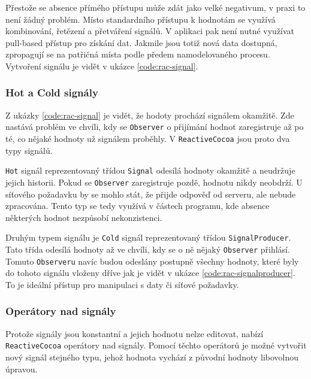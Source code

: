 Přestože se absence přímého přístupu může zdát jako velké negativum, v praxi to není žádný problém.
Místo standardního přístupu k hodnotám se využívá kombinování, řetězení a přetváření signálů.
V aplikaci pak není nutné využívat pull-based přístup pro získání dat.
Jakmile jsou totiž nová data dostupná, zpropagují se na patřičná místa podle předem namodelovaného procesu.
Vytvoření signálu je vidět v ukázce \ref{code:rac-signal}.


\subsubsection*{Hot a Cold signály}

Z ukázky \ref{code:rac-signal} je vidět, že hodoty prochází signálem okamžitě.
Zde nastává problém ve chvíli, kdy se \texttt{Observer} o přijímání hodnot zaregistruje až po té, co nějaké hodnoty už signálem proběhly.
V \texttt{ReactiveCocoa} jsou proto dva typy signálů.

\texttt{Hot} signál reprezentovaný třídou \texttt{Signal} odesílá hodnoty okamžitě a neudržuje jejich historii.
Pokud se \texttt{Observer} zaregistruje pozdě, hodnotu nikdy neobdrží.
U síťového požadavku by se mohlo stát, že přijde odpověď od serveru, ale nebude zpracována.
Tento typ se tedy využívá v částech programu, kde absence některých hodnot nezpůsobí nekonzistenci.

Druhým typem signálu je \texttt{Cold} signál reprezentovaný třídou \texttt{SignalProducer}.
Tato třída odesílá hodnoty až ve chvíli, kdy se o ně nějaký \texttt{Observer} přihlásí.
Tomuto \texttt{Observeru} navíc budou odeslány postupně všechny hodnoty, které byly do tohoto signálu vloženy dříve jak je vidět v ukázce \ref{code:rac-signalproducer}.
To je ideální přístup pro manipulaci s daty či síťové požadavky.


\subsubsection*{Operátory nad signály}

Protože signály jsou konstantní a jejich hodnotu nelze editovat, nabízí \texttt{ReactiveCocoa} operátory nad signály.
Pomocí těchto operátorů je možné vytvořit nový signál stejného typu, jehož hodnota vychází z původní hodnoty libovolnou úpravou.

